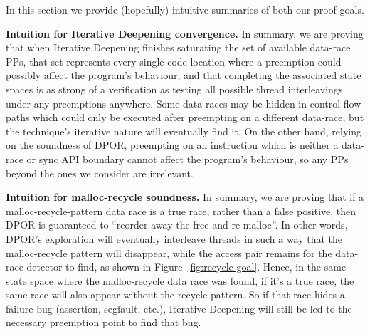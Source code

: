In this section we provide (hopefully) intuitive summaries of both our proof goals.

{\bf Intuition for Iterative Deepening convergence.}
In summary, we are proving that when Iterative Deepening finishes saturating the set of available data-race PPs,
that set represents every single code location where a preemption could possibly affect the program's behaviour,
and that completing the associated state spaces is as strong of a verification as testing all possible thread interleavings under any preemptions anywhere.
Some data-races may be hidden in control-flow paths which could only be executed after preempting on a different data-race,
but the technique's iterative nature will eventually find it.
On the other hand, relying on the soundness of DPOR, preempting on an instruction which is neither a data-race or sync API boundary cannot affect the program's behaviour,
so any PPs beyond the ones we consider are irrelevant.

{\bf Intuition for malloc-recycle soundness.}
In summary, we are proving that if a malloc-recycle-pattern data race is a true race, rather than a false positive,
then DPOR is guaranteed to ``reorder away the free and re-malloc''.
In other words, DPOR's exploration will eventually interleave threads in such a way that the malloc-recycle pattern will disappear,
while the access pair remains for the data-race detector to find, as shown in Figure~\ref{fig:recycle-goal}.
Hence, in the same state space where the malloc-recycle data race was found, if it's a true race, the same race will also appear without the recycle pattern.
So if that race hides a failure bug (assertion, segfault, etc.), Iterative Deepening will still be led to the necessary preemption point to find that bug.
